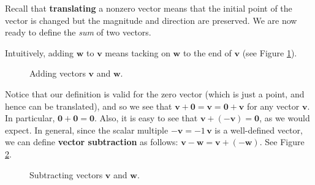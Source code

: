 Recall that \textbf{translating} a nonzero vector means that the initial point of the vector
is changed but the magnitude and direction are preserved. We are now ready to define
the \emph{sum} of two vectors.


Intuitively, adding $\mathbf{w}$ to $\mathbf{v}$ means tacking on $\mathbf{w}$ to the end of $\mathbf{v}$ (see Figure
\ref{fig:sum}).

\begin{figure}[h]
 \centering
 \qquad
 \qquad
 \caption[]{\quad Adding vectors $\mathbf{v}$ and $\mathbf{w}$.}
 \label{fig:sum}
\end{figure}

Notice that our definition is valid for the zero vector (which is just a point, and hence can be translated), and
so we see that $\mathbf{v} + \mathbf{0} = \mathbf{v} = \mathbf{0} + \mathbf{v}$ for any vector $\mathbf{v}$. 
In particular, $\mathbf{0} + \mathbf{0} = \mathbf{0}$. 
Also, it is easy to see that $\mathbf{v} + (-\mathbf{v}) =
\mathbf{0}$, as we would expect. In general, since the scalar multiple $-\mathbf{v} = -1 \,\mathbf{v}$ is a
well-defined vector, we can define \textbf{vector subtraction} as follows:
$\mathbf{v} - \mathbf{w} = \mathbf{v} + (-\mathbf{w})$. See Figure \ref{fig:subtract}.

\begin{figure}[h]
 \centering
 \qquad
 \qquad
 \caption[]{\quad Subtracting vectors $\mathbf{v}$ and $\mathbf{w}$.}
 \label{fig:subtract}
\end{figure}

